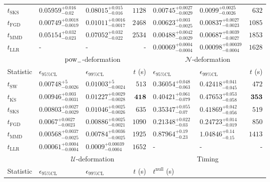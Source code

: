 \begin{tabular}{l|llr|llr}
	$t_{\mathrm{SKS}}$ & $0.05959_{-0.02}^{+0.016}$ & $0.08015_{-0.016}^{+0.015}$ & $1128$ & $0.00745_{-0.0029}^{+0.0027}$ & $0.0099_{-0.0026}^{+0.0025}$ & $632$ \\
	$t_{\mathrm{FGD}}$ & ${\mathbf{0.00749_{-0.0019}^{+0.0018}}}$ & ${\mathbf{0.01011_{-0.0017}^{+0.0016}}}$ & $2468$ & $0.00623_{-0.0025}^{+0.003}$ & $0.00837_{-0.0023}^{+0.0027}$ & $1085$ \\
	$t_{\mathrm{MMD}}$ & $0.05154_{-0.023}^{+0.032}$ & $0.07052_{-0.022}^{+0.032}$ & $2534$ & ${\mathbf{0.00488_{-0.0029}^{+0.0042}}}$ & ${\mathbf{0.00687_{-0.0027}^{+0.0039}}}$ & $1853$ \\
	$t_{\mathrm{LLR}}$ & - & - & - & $0.00069_{-0.0004}^{+0.0004}$ & $0.00098_{-0.0004}^{+0.00039}$ & $1628$ \\
	\toprule
	\multicolumn{1}{c}{} & \multicolumn{3}{c}{$\rm{pow}_{-}$-deformation} & \multicolumn{3}{c}{$\mathcal{N}$-deformation} \\
	Statistic & $\epsilon_{95\%\mathrm{CL}}$ & $\epsilon_{99\%\mathrm{CL}}$ & $t$ (s) & $\epsilon_{95\%\mathrm{CL}}$ & $\epsilon_{99\%\mathrm{CL}}$ & $t$ (s) \\
	\midrule
	$t_{\mathrm{SW}}$ & $0.00748_{-0.0026}^{+5}$ & $0.01003_{-0.0024}^{+5}$ & $513$ & $0.36054_{-0.063}^{+0.048}$ & $0.42418_{-0.045}^{+0.041}$ & $472$ \\
	$t_{\overline{\mathrm{KS}}}$ & $0.00946_{-0.0031}^{+0.003}$ & $0.01227_{-0.0028}^{+0.0029}$ & ${\mathbf{418}}$ & $0.40421_{-0.079}^{+0.061}$ & $0.47653_{-0.058}^{+0.053}$ & ${\mathbf{353}}$ \\
	$t_{\mathrm{SKS}}$ & $0.00803_{-0.0029}^{+0.0027}$ & $0.01046_{-0.0026}^{+0.0025}$ & $635$ & $0.35347_{-0.07}^{+0.055}$ & $0.41869_{-0.056}^{+0.042}$ & $519$ \\
	$t_{\mathrm{FGD}}$ & $0.0067_{-0.0023}^{+0.0027}$ & $0.00886_{-0.0021}^{+0.0025}$ & $1090$ & ${\mathbf{0.21348_{-0.03}^{+0.022}}}$ & ${\mathbf{0.24723_{-0.019}^{+0.014}}}$ & $850$ \\
	$t_{\mathrm{MMD}}$ & ${\mathbf{0.00568_{-0.0025}^{+0.0037}}}$ & ${\mathbf{0.00784_{-0.0025}^{+0.0036}}}$ & $1925$ & $0.87964_{-0.23}^{+0.19}$ & $1.04846_{-0.15}^{+0.14}$ & $1413$ \\
	$t_{\mathrm{LLR}}$ & $0.00061_{-0.0004}^{+0.0004}$ & $0.0009_{-0.0004}^{+0.00039}$ & $1652$ & - & - & - \\
	\toprule
	\multicolumn{1}{c}{} & \multicolumn{3}{c}{$\mathcal{U}$-deformation} & \multicolumn{3}{c}{Timing} \\
	Statistic & $\epsilon_{95\%\mathrm{CL}}$ & $\epsilon_{99\%\mathrm{CL}}$ & $t$ (s) & $t^{\mathrm{null}}$ (s) \\

\end{tabular}
